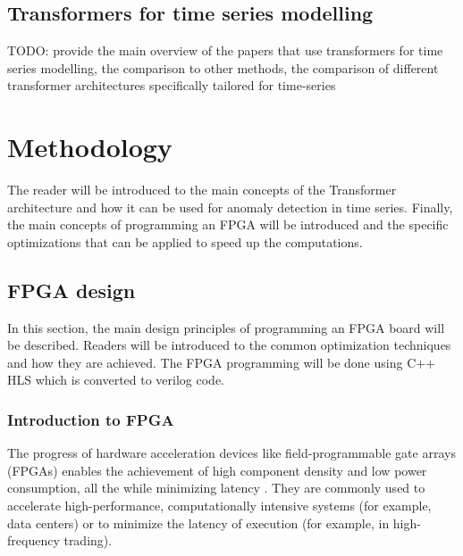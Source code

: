 \documentclass[a4paper, twoside]{report}
\theoremstyle{definition}
\numberwithin{equation}{section}
\begin{document}
\section{Transformers for time series modelling}

TODO: provide the main overview of the papers that use transformers for time series modelling,
the comparison to other methods, the comparison of different transformer architectures specifically
tailored for time-series


\chapter{Methodology}

The reader will be introduced to the main concepts of the Transformer architecture and how it can be used for anomaly detection in time series.
Finally, the main concepts of programming an FPGA will be introduced and the specific optimizations that can be applied to speed up the computations.

\section{FPGA design}


In this section, the main design principles of programming an FPGA board will be described. Readers will be introduced to the common optimization techniques and how they are achieved. The FPGA programming will be done using C++ HLS which is converted to verilog code.

\subsection{Introduction to FPGA}


The progress of hardware acceleration devices like field-programmable gate arrays (FPGAs) enables the achievement of high component density and low power consumption,
all the while minimizing latency \cite{10.1007/978-3-319-56258-2_14}.
They are commonly used to accelerate high-performance, computationally intensive systems
(for example, data centers) or to minimize the latency of execution (for example, in high-frequency trading).
\end{document}
